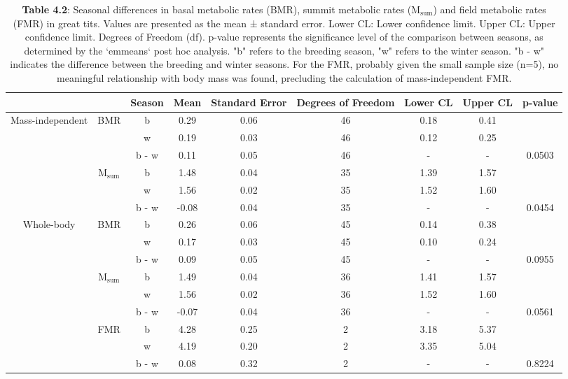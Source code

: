 \documentclass[10pt, twoside]{book} %
\begin{document}
\begin{sidewaystable}[!ht]
    \centering
\caption*{\textbf{Table 4.2}: Seasonal differences in basal metabolic rates (BMR), summit metabolic rates (M$_{\text{sum}}$) and field metabolic rates (FMR) in great tits. Values are presented as the mean ± standard error. Lower CL: Lower confidence limit. Upper CL: Upper confidence limit. Degrees of Freedom (df). p-value represents the significance level of the comparison between seasons, as determined by the `emmeans` post hoc analysis. "b" refers to the breeding season, "w" refers to the winter season. "b - w" indicates the difference between the breeding and winter seasons. For the FMR, probably given the small sample size (n=5), no meaningful relationship with body mass was found, precluding the calculation of mass-independent FMR.}
\begin{adjustbox}{max width=\textwidth}    
    \begin{tabular}{ccccccccc}
    \hline
        ~ & ~ & Season & Mean & Standard Error & Degrees of Freedom & Lower CL & Upper CL & p-value \\ \hline
        Mass-independent & BMR & b & 0.29 & 0.06 & 46 & 0.18 & 0.41 & ~ \\ 
        ~ & ~ & w & 0.19 & 0.03 & 46 & 0.12 & 0.25 & ~ \\ 
        ~ & ~ & b - w & 0.11 & 0.05 & 46 & - & - & 0.0503 \\ 
        ~ & M$_{\text{sum}}$ & b & 1.48 & 0.04 & 35 & 1.39 & 1.57 & ~ \\ 
        ~ & ~ & w & 1.56 & 0.02 & 35 & 1.52 & 1.60 & ~ \\ 
        ~ & ~ & b - w & -0.08 & 0.04 & 35 & - & - & 0.0454 \\ 
        Whole-body & BMR & b & 0.26 & 0.06 & 45 & 0.14 & 0.38 & ~ \\ 
        ~ & ~ & w & 0.17 & 0.03 & 45 & 0.10 & 0.24 & ~ \\ 
        ~ & ~ & b - w & 0.09 & 0.05 & 45 & - & - & 0.0955 \\ 
        ~ & M$_{\text{sum}}$ & b & 1.49 & 0.04 & 36 & 1.41 & 1.57 & ~ \\ 
        ~ & ~ & w & 1.56 & 0.02 & 36 & 1.52 & 1.60 & ~ \\ 
        ~ & ~ & b - w & -0.07 & 0.04 & 36 & - & - & 0.0561 \\ 
        ~ & FMR & b & 4.28 & 0.25 & 2 & 3.18 & 5.37 & ~ \\ 
        ~ & ~ & w & 4.19 & 0.20 & 2 & 3.35 & 5.04 & ~ \\ 
        ~ & ~ & b - w & 0.08 & 0.32 & 2 & - & - & 0.8224 \\ \hline
    \end{tabular}
\end{adjustbox}
\end{sidewaystable}
\end{document}

